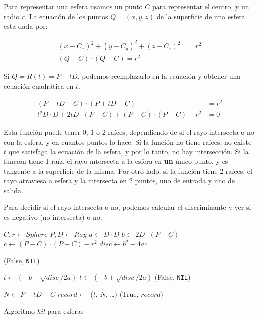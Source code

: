 Para representar una esfera usamos un punto $C$ para representar el centro, y un
radio $r$. La ecuación de los puntos $Q=(x, y, z)$ de la superficie de una
esfera esta dada por:

\begin{align*}
    (x - C_x)^2 + (y - C_y)^2 + (z - C_z)^2 &= r^2 \\
    (Q - C) \cdot (Q - C) = r^2
\end{align*}

Si $Q = R(t) = P + tD$, podemos reemplazarlo en la ecuación y obtener una
ecuación cuadrática en $t$.

\begin{align*}
    (P + tD - C) \cdot (P + tD - C) &= r^2 \\
    t^2 D \cdot D + 2tD \cdot (P - C) + (P - C) \cdot (P - C) - r^2 &= 0
    \label{eq:cuad-esfera}
\end{align*}

Esta función puede tener 0, 1 o 2 raíces, dependiendo de si el rayo intersecta o
no con la esfera, y en cuantos puntos lo hace. Si la función no tiene raíces, no
existe $t$ que satisfaga la ecuación de la esfera, y por lo tanto, no hay
intersección. Si la función tiene 1 raíz, el rayo intersecta a la esfera en
\textbf{un} único punto, y es tangente a la superficie de la misma. Por otro
lado, si la función tiene 2 raíces, el rayo atraviesa a esfera y la intersecta
en 2 puntos, uno de entrada y uno de salida.

Para decidir si el rayo intersecta o no, podemos calcular el discriminante y ver
si es negativo (no intersecta) o no.

\begin{algorithm}[H]
\begin{algorithmic}[1]
    \State $C, r \gets Sphere$ 
    \State $P, D \gets Ray$ 
    \State $a \gets D \cdot D$
    \State $b \gets 2D \cdot (P - C)$
    \State $c \gets (P - C) \cdot (P - C) - r^2$
    \State $disc \gets b^2 - 4ac$

        \State \Return (False, \texttt{NIL})
    \EndIf

    \State $t \gets (-b - \sqrt{disc} / 2a)$
        \State $t \gets (-b + \sqrt{disc} / 2a)$
            \State \Return (False, \texttt{NIL})
        \EndIf
    \EndIf

    \State $N \gets P + tD - C$ 
    \State $record \gets$ ($t$, $N$, \dots) 
    \State \Return (True, $record$)
\EndFunction
\end{algorithmic}
\caption{Algoritmo \textit{hit} para esferas}
\label{alg:sphere-hit}
\end{algorithm}

